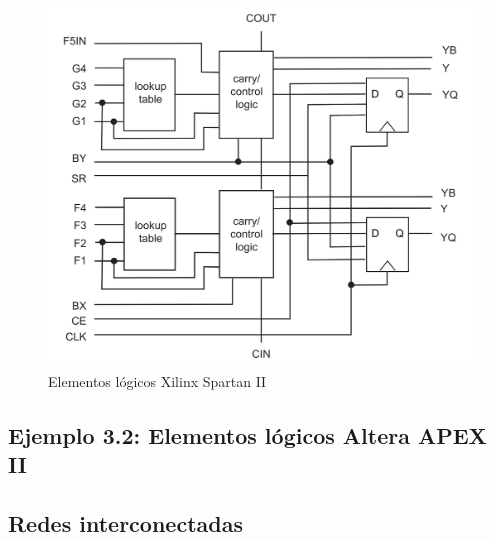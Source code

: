 \begin{figure}[H] \centering
    \includegraphics[width=0.6\linewidth]{Imagenes/03/03-Xilinx_Spartan_II.png}
    \caption{Elementos lógicos Xilinx Spartan II}%
    \label{Fig:03-Xilinx-Spartan-II}
\end{figure}

\vspace*{1em}

\begin{Ejemplo}
\subsection*{Ejemplo 3.2: Elementos lógicos Altera APEX II}
\end{Ejemplo}


\subsection{Redes interconectadas}